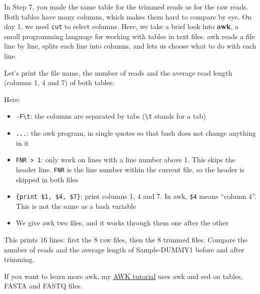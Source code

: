 \documentclass[
  letterpaper,
  DIV=11,
  numbers=noendperiod]{scrreprt}
\newenvironment{Shaded}{}{}
\newcommand{\AttributeTok}[1]{\textcolor[rgb]{0.84,0.23,0.29}{#1}}
\newcommand{\FunctionTok}[1]{\textcolor[rgb]{0.44,0.26,0.76}{#1}}
\newcommand{\NormalTok}[1]{\textcolor[rgb]{0.14,0.16,0.18}{#1}}
\newcommand{\StringTok}[1]{\textcolor[rgb]{0.01,0.18,0.38}{#1}}
\providecommand{\tightlist}{%
  \setlength{\itemsep}{0pt}\setlength{\parskip}{0pt}}
\begin{document}
\begin{tcolorbox}[enhanced jigsaw, colbacktitle=quarto-callout-tip-color!10!white, rightrule=.15mm, leftrule=.75mm, colback=white, opacitybacktitle=0.6, title=\textcolor{quarto-callout-tip-color}{\faLightbulb}\hspace{0.5em}{Tip: Comparing reads before and after trimming (optional)}, bottomrule=.15mm, left=2mm, colframe=quarto-callout-tip-color-frame, opacityback=0, breakable, bottomtitle=1mm, coltitle=black, arc=.35mm, toprule=.15mm, toptitle=1mm, titlerule=0mm]

In Step 7, you made the same table for the trimmed reads as for the raw
reads. Both tables have many columns, which makes them hard to compare
by eye. On day 1, we used \texttt{cut} to select columns. Here, we take
a brief look into \textbf{awk}, a small programming language for working
with tables in text files. awk reads a file line by line, splits each
line into columns, and lets us choose what to do with each line.

Let's print the file name, the number of reads and the average read
length (columns 1, 4 and 7) of both tables:

\begin{Shaded}
\end{Shaded}

Here:

\begin{itemize}
\tightlist
\item
  \texttt{-F\textquotesingle{}\textbackslash{}t\textquotesingle{}}: the
  columns are separated by tabs (\texttt{\textbackslash{}t} stands for a
  tab)
\item
  \texttt{\textquotesingle{}...\textquotesingle{}}: the awk program, in
  single quotes so that bash does not change anything in it
\item
  \texttt{FNR\ \textgreater{}\ 1}: only work on lines with a line number
  above 1. This skips the header line. \texttt{FNR} is the line number
  within the current file, so the header is skipped in both files
\item
  \texttt{\{print\ \$1,\ \$4,\ \$7\}}: print columns 1, 4 and 7. In awk,
  \texttt{\$4} means ``column 4''. This is not the same as a bash
  variable
\item
  We give awk two files, and it works through them one after the other
\end{itemize}

This prints 16 lines: first the 8 raw files, then the 8 trimmed files.
Compare the number of reads and the average length of Sample-DUMMY1
before and after trimming.

If you want to learn more awk, my
\href{https://ndombrowski.github.io/AWK_tutorial/}{AWK tutorial} uses
awk and sed on tables, FASTA and FASTQ files.

\end{tcolorbox}
\end{document}
